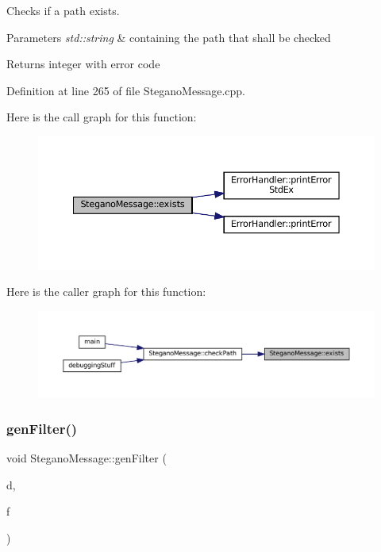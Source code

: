 Checks if a path exists. 


\begin{DoxyParams}{Parameters}
{\em std\+::string} & containing the path that shall be checked \\
\hline
\end{DoxyParams}
\begin{DoxyReturn}{Returns}
integer with error code 
\end{DoxyReturn}


Definition at line 265 of file Stegano\+Message.\+cpp.

Here is the call graph for this function\+:\nopagebreak
\begin{figure}[H]
\begin{center}
\leavevmode
\includegraphics[width=350pt]{classSteganoMessage_acc5a49a35b46d8bf4c40cca8b8c5a52b_cgraph}
\end{center}
\end{figure}
Here is the caller graph for this function\+:\nopagebreak
\begin{figure}[H]
\begin{center}
\leavevmode
\includegraphics[width=350pt]{classSteganoMessage_acc5a49a35b46d8bf4c40cca8b8c5a52b_icgraph}
\end{center}
\end{figure}
\mbox{\label{classSteganoMessage_a1cb326688e9a054127396d198bd6f976}} 
\subsubsection{\texorpdfstring{genFilter()}{genFilter()}}
{\footnotesize\ttfamily void Stegano\+Message\+::gen\+Filter (\begin{DoxyParamCaption}\item[{std\+::vector$<$ std\+::vector$<$ uint32\+\_\+t $>$$>$ $\ast$}]{d,  }\item[{uint32\+\_\+t($\ast$)(uint32\+\_\+t, size\+\_\+t)}]{f }\end{DoxyParamCaption})\hspace{0.3cm}{\ttfamily [private]}}



